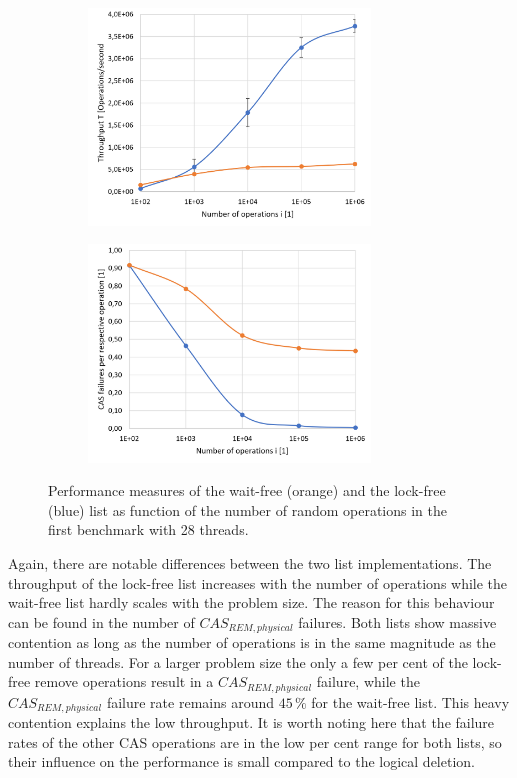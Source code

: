 \documentclass[a4paper, 12pt]{article}
\begin{document}
\begin{figure} [h!]
\begin{subfigure}[c]{0.45\textwidth}
\includegraphics[width=7.5cm]{tp_vs_i.png}
\centering
{}
\end{subfigure}
\begin{subfigure}[c]{0.45\textwidth}
\includegraphics[width=7.5cm]{cas_rem_vs_i.png}
\centering
{}
\end{subfigure}
\caption{Performance measures of the wait-free (orange) and the lock-free (blue) list as function of the number of random operations in the first benchmark with 28 threads.}
\label{performance_i}
\end{figure}

Again, there are notable differences between the two list implementations. The throughput of the lock-free list increases with the number of operations while the wait-free list hardly scales with the problem size. The reason for this behaviour can be found in the number of $CAS_{REM, physical}$ failures. Both lists show massive contention as long as the number of operations is in the same magnitude as the number of threads. For a larger problem size the only a few per cent of the lock-free remove operations result in a $CAS_{REM, physical}$ failure, while the $CAS_{REM, physical}$ failure rate remains around $45\,\%$ for the wait-free list. This heavy contention explains the low throughput. It is worth noting here that the failure rates of the other CAS operations are in the low per cent range for both lists, so their influence on the performance is small compared to the logical deletion.
\end{document}
